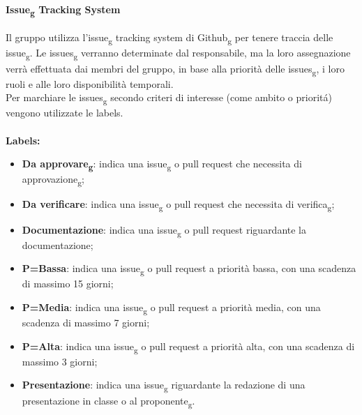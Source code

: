 \paragraph{Issue\textsubscript{g} Tracking System}
Il gruppo utilizza l'issue\textsubscript{g} tracking system di Github\textsubscript{g} per tenere traccia delle issue\textsubscript{g}. 
Le issues\textsubscript{g} verranno determinate dal responsabile, ma la loro assegnazione verrà effettuata dai membri del gruppo, in base alla priorità delle issues\textsubscript{g}, i loro ruoli e alle loro disponibilità temporali.\\
Per marchiare le issues\textsubscript{g} secondo criteri di interesse (come ambito o prioritá) vengono utilizzate le labels.
\\\\\textbf{Labels:}
\begin{itemize}
	\item \textbf{Da approvare\textsubscript{g}}: indica una issue\textsubscript{g} o pull request che necessita di approvazione\textsubscript{g};
	\item \textbf{Da verificare}: indica una issue\textsubscript{g} o pull request che necessita di verifica\textsubscript{g};
	\item \textbf{Documentazione}: indica una issue\textsubscript{g} o pull request riguardante la documentazione;
	\item \textbf{P=Bassa}: indica una issue\textsubscript{g} o pull request a priorità bassa, con una scadenza di massimo 15 giorni;
	\item \textbf{P=Media}: indica una issue\textsubscript{g} o pull request a priorità media, con una scadenza di massimo 7 giorni;
	\item \textbf{P=Alta}: indica una issue\textsubscript{g} o pull request a priorità alta, con una scadenza di massimo 3 giorni;
	\item \textbf{Presentazione}: indica una issue\textsubscript{g} riguardante la redazione di una presentazione in classe o al proponente\textsubscript{g}.
\end{itemize}

